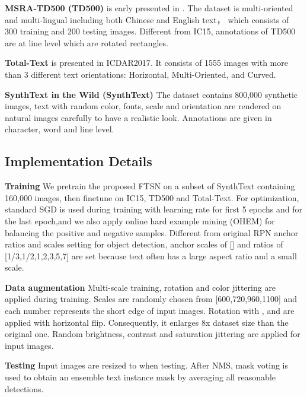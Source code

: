 \documentclass[a4paper,conference]{IEEEtran}
\begin{document}
\textbf{MSRA-TD500 (TD500)} is early presented in \cite{yao2012detecting}. The dataset is multi-oriented and multi-lingual including both Chinese and English text， which consists of 300 training and 200 testing images. Different from IC15, annotations of TD500 are at line level which are rotated rectangles.

\textbf{Total-Text} is presented in ICDAR2017\cite{CK2017}. It consists of 1555 images with more than 3 different text orientations: Horizontal, Multi-Oriented, and Curved.

\textbf{SynthText in the Wild (SynthText)} The dataset contains 800,000 synthetic images\cite{Gupta2016Synthetic}, text with random color, fonts, scale and orientation are rendered on natural images carefully to have a realistic look. Annotations are given in character, word and line level. 

\subsection{Implementation Details}
\textbf{Training} We pretrain the proposed FTSN on a subset of SynthText containing 160,000 images, then finetune on IC15, TD500 and Total-Text. For optimization, standard SGD is used during training with learning rate  for first 5 epochs and  for the last epoch,and we also apply online  hard  example  mining (OHEM)\cite{shrivastava2016training} for balancing the positive and negative samples. Different from original RPN anchor ratios and scales setting for object detection, anchor scales of [] and ratios of [1/3,1/2,1,2,3,5,7] are set because text often has a large aspect ratio and a small scale\cite{Liao2016TextBoxes}.

\textbf{Data augmentation} Multi-scale training, rotation and color jittering are applied during training. Scales are randomly chosen from [600,720,960,1100] and each number represents the short edge of input images. Rotation with  ,  and   are applied with horizontal flip. Consequently, it enlarges 8x dataset size than the original one. Random brightness, contrast and saturation jittering are applied for input images.

\textbf{Testing} Input images are resized to  when testing. After NMS, mask voting\cite{dai2016instance} is used to obtain an ensemble text instance mask by averaging all reasonable detections. 
\end{document}
